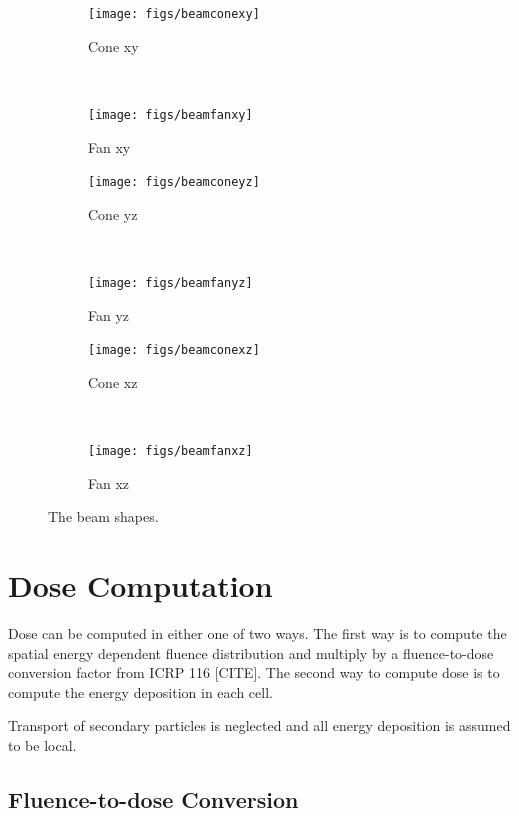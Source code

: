\begin{figure}
    \centering
    \begin{subfigure}[b]{0.45\textwidth}
        \texttt{[image: figs/beamconexy]}
        \caption{Cone xy}
        \label{fig:beamconexy}
    \end{subfigure}
    ~
    \begin{subfigure}[b]{0.45\textwidth}
        \texttt{[image: figs/beamfanxy]}
        \caption{Fan xy}
        \label{fig:beamfanxy}
    \end{subfigure}

    \begin{subfigure}[b]{0.45\textwidth}
        \texttt{[image: figs/beamconeyz]}
        \caption{Cone yz}
        \label{fig:beamconeyz}
    \end{subfigure}
    ~
    \begin{subfigure}[b]{0.45\textwidth}
        \texttt{[image: figs/beamfanyz]}
        \caption{Fan yz}
        \label{fig:beamfanyz}
    \end{subfigure}
    
    \begin{subfigure}[b]{0.45\textwidth}
        \texttt{[image: figs/beamconexz]}
        \caption{Cone xz}
        \label{fig:beamconexz}
    \end{subfigure}
    ~
    \begin{subfigure}[b]{0.45\textwidth}
        \texttt{[image: figs/beamfanxz]}
        \caption{Fan xz}
        \label{fig:beamfanxz}
    \end{subfigure}
    \caption{The beam shapes.}\label{fig:beamfancone}
\end{figure}

\section{Dose Computation}
Dose can be computed in either one of two ways. The first way is to compute the spatial energy dependent fluence distribution and multiply by a fluence-to-dose conversion factor from ICRP 116 [CITE]. The second way to compute dose is to compute the energy deposition in each cell.

Transport of secondary particles is neglected and all energy deposition is assumed to be local.

\subsection{Fluence-to-dose Conversion}

